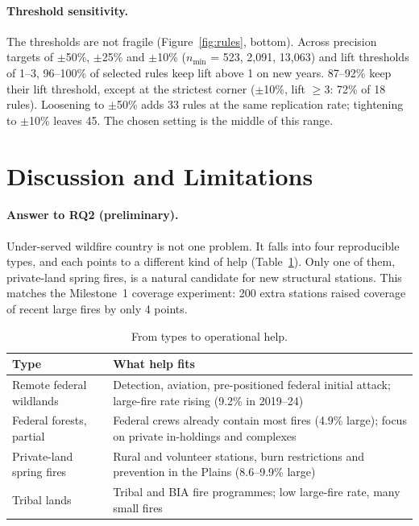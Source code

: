 \documentclass[10pt,twocolumn,letterpaper]{article}
\begin{document}
\paragraph{Threshold sensitivity.} The thresholds are not fragile (Figure~\ref{fig:rules}, bottom). Across precision targets of $\pm$50\%, $\pm$25\% and $\pm$10\% ($n_{\min}$ = 523, 2{,}091, 13{,}063) and lift thresholds of 1--3, 96--100\% of selected rules keep lift above 1 on new years. 87--92\% keep their lift threshold, except at the strictest corner ($\pm$10\%, lift $\geq$3: 72\% of 18 rules). Loosening to $\pm$50\% adds 33 rules at the same replication rate; tightening to $\pm$10\% leaves 45. The chosen setting is the middle of this range.

\section{Discussion and Limitations}
\paragraph{Answer to RQ2 (preliminary).} Under-served wildfire country is not one problem. It falls into four reproducible types, and each points to a different kind of help (Table~\ref{tab:help}). Only one of them, private-land spring fires, is a natural candidate for new structural stations. This matches the Milestone~1 coverage experiment: 200 extra stations raised coverage of recent large fires by only 4 points.

\begin{table}[!htb]
\centering\footnotesize
\caption{From types to operational help.}
\label{tab:help}
\begin{tabularx}{\columnwidth}{@{}lX@{}}
\toprule
Type & What help fits \\
\midrule
Remote federal wildlands & Detection, aviation, pre-positioned federal initial attack; large-fire rate rising (9.2\% in 2019--24) \\
Federal forests, partial & Federal crews already contain most fires (4.9\% large); focus on private in-holdings and complexes \\
Private-land spring fires & Rural and volunteer stations, burn restrictions and prevention in the Plains (8.6--9.9\% large) \\
Tribal lands & Tribal and BIA fire programmes; low large-fire rate, many small fires \\
\bottomrule
\end{tabularx}
\end{table}
\end{document}
